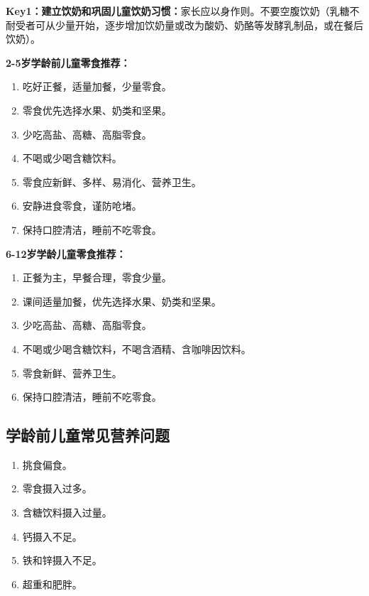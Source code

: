 \begin{keybox}
\textbf{Key1：建立饮奶和巩固儿童饮奶习惯：}家长应以身作则。不要空腹饮奶（乳糖不耐受者可从少量开始，逐步增加饮奶量或改为酸奶、奶酪等发酵乳制品，或在餐后饮奶）。

\textbf{2-5岁学龄前儿童零食推荐：}
\begin{enumerate}
    \item 吃好正餐，适量加餐，少量零食。
    \item 零食优先选择水果、奶类和坚果。
    \item 少吃高盐、高糖、高脂零食。
    \item 不喝或少喝含糖饮料。
    \item 零食应新鲜、多样、易消化、营养卫生。
    \item 安静进食零食，谨防呛堵。
    \item 保持口腔清洁，睡前不吃零食。
\end{enumerate}

\textbf{6-12岁学龄儿童零食推荐：}
\begin{enumerate}
    \item 正餐为主，早餐合理，零食少量。
    \item 课间适量加餐，优先选择水果、奶类和坚果。
    \item 少吃高盐、高糖、高脂零食。
    \item 不喝或少喝含糖饮料，不喝含酒精、含咖啡因饮料。
    \item 零食新鲜、营养卫生。
    \item 保持口腔清洁，睡前不吃零食。
\end{enumerate}
\end{keybox}

\subsection{学龄前儿童常见营养问题}

\begin{defbox}
\begin{enumerate}[leftmargin=*]
    \item 挑食偏食。
    \item 零食摄入过多。
    \item 含糖饮料摄入过量。
    \item 钙摄入不足。
    \item 铁和锌摄入不足。
    \item 超重和肥胖。
\end{enumerate}
\end{defbox}


